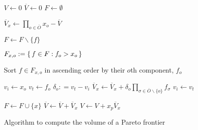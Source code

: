 \begin{figure}[!ht]
\caption{Algorithm to compute the volume of a Pareto frontier}
\begin{algorithmic}[1]

\State $V \gets 0$
\State $\overbar{V} \gets 0$
\State $F \gets \emptyset$


	\State $\overbar{V}_x \gets \prod_{o \in \overbar{O}} x_{o} - \overbar{V}$
		
			\State $F \gets F \backslash \{f\}$
		\EndIf
	\EndFor
	
	
		\State $F_{x,o} := \set{f \in F : f_o > x_o}$
		
		\State Sort $f \in F_{x,o}$ in ascending order by their $o$th component, $f_o$
		
		\State $v_i \gets x_o$
			\State $v_t \gets f_o$
			\State $\delta_o :	= v_t - v_i$
			\State $\overbar{V}_x \gets \overbar{V}_x + \delta_o \prod_{\sigma \in \overbar{O} \backslash \{o\}} f_\sigma$
			\State $v_i \gets v_t$
		\EndFor
		
	\EndFor
	
	\State $F \gets F \cup \{x\}$
	\State $\overbar{V} \gets \overbar{V} + \overbar{V}_x$
	\State $V \gets V + x_p \overbar{V}_x$
\EndFor


\end{algorithmic}
\end{figure}